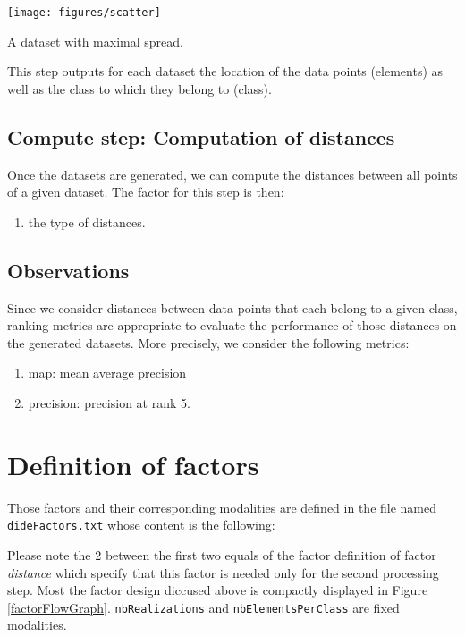 \documentclass[12pt,a4paper,fleqn]{tufte-handout}
\begin{document}
\begin{marginfigure}
\texttt{[image: figures/scatter]}
\caption{A dataset with maximal spread.}
\label{scatter}
\end{marginfigure}

This step outputs for each dataset the location of the data points (elements) as well as the class to which they belong to (class).

\subsection{\textbf{Compute step}: Computation of distances}

Once the datasets are generated, we can compute the distances between all points of a given dataset. The factor for this step is then:
\begin{enumerate}
\item the type of distances.
\end{enumerate}

\subsection{Observations}

Since we consider distances between data points that each belong to a given class, ranking metrics are appropriate to evaluate the performance of those distances on the generated datasets. More precisely, we consider the following metrics:
\begin{enumerate}
\item map: mean average precision
\item precision: precision at rank 5.
\end{enumerate}

\section{Definition of factors}

Those factors and their corresponding modalities are defined in the file named \texttt{dideFactors.txt} whose content is the following:


Please note the 2 between the first two equals of the factor definition of factor \textit{distance} which specify that this factor is needed only for the second processing step. Most the factor design diccused above is compactly displayed in Figure \ref{factorFlowGraph}. \texttt{nbRealizations} and \texttt{nbElementsPerClass} are fixed modalities.
\end{document}
